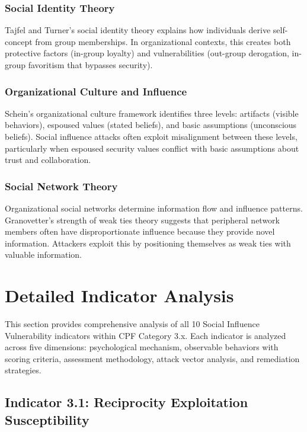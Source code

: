 \documentclass[11pt,a4paper]{article}
\begin{document}
\subsubsection{Social Identity Theory}

Tajfel and Turner's social identity theory\cite{tajfel1979} explains how individuals derive self-concept from group memberships. In organizational contexts, this creates both protective factors (in-group loyalty) and vulnerabilities (out-group derogation, in-group favoritism that bypasses security).

\subsubsection{Organizational Culture and Influence}

Schein's organizational culture framework\cite{schein2010} identifies three levels: artifacts (visible behaviors), espoused values (stated beliefs), and basic assumptions (unconscious beliefs). Social influence attacks often exploit misalignment between these levels, particularly when espoused security values conflict with basic assumptions about trust and collaboration.

\subsubsection{Social Network Theory}

Organizational social networks determine information flow and influence patterns. Granovetter's strength of weak ties theory\cite{granovetter1973} suggests that peripheral network members often have disproportionate influence because they provide novel information. Attackers exploit this by positioning themselves as weak ties with valuable information.

\section{Detailed Indicator Analysis}

This section provides comprehensive analysis of all 10 Social Influence Vulnerability indicators within CPF Category 3.x. Each indicator is analyzed across five dimensions: psychological mechanism, observable behaviors with scoring criteria, assessment methodology, attack vector analysis, and remediation strategies.

\subsection{Indicator 3.1: Reciprocity Exploitation Susceptibility}
\end{document}
